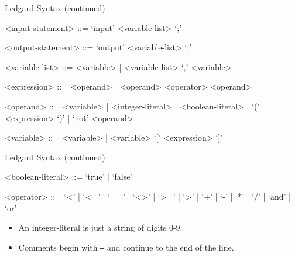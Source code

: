 \documentclass{beamer}
\begin{document}
\begin{frame}{Ledgard Syntax (continued)}
    \begin{grammar}
        <input-statement> ::= `input' <variable-list> `;'

        <output-statement> ::= `output' <variable-list> `;'

        <variable-list> ::= <variable> | <variable-list> `,'
            <variable>

        <expression> ::= <operand> | <operand> <operator> <operand>

        <operand> ::= <variable> | <integer-literal>
            | <boolean-literal> | `(' <expression> `)' |
            `not' <operand>

        <variable> ::= <variable> | <variable> `[' <expression> `]'
    \end{grammar}
\end{frame}

\begin{frame}{Ledgard Syntax (continued)}
    \begin{grammar}
        <boolean-literal> ::= `true' | `false'

        <operator> ::= `<' | `<=' | `==' | `<>' | `>=' | `>' |
          `+' | `-' | `*' | `/' | `and' | `or'
    \end{grammar}

    \begin{itemize}
        \item An integer-literal is just a string of digits 0-9.
        \item Comments begin with \texttt{--} and continue to the end
          of the line.
    \end{itemize}
\end{frame}
\end{document}
